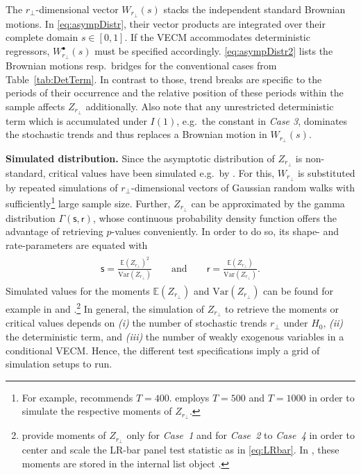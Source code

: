 The $ r_\perp $-dimensional vector $ W_{r_\perp} {\left( s \right)} $ stacks the independent standard Brownian motions. In \eqref{eq:asympDistr}, their vector products are integrated over their complete domain $ s \in [0,1] $. If the VECM accommodates deterministic regressors, $ W^\bullet_{r_\perp} {\left( s \right)} $ must be specified accordingly. \eqref{eq:asympDistr2} lists the Brownian motions resp.~bridges for the conventional cases from Table~\ref{tab:DetTerm}. In contrast to those, trend breaks are specific to the periods of their occurrence and the relative position of these periods within the sample affects $ Z_{r_\perp} $ additionally. Also note that any unrestricted deterministic term which is accumulated under $ I(1) $, e.g.~the constant in \textit{Case 3}, dominates the stochastic trends and thus replaces a Brownian motion in $ W_{r_\perp} {\left( s \right)} $.

\textbf{Simulated distribution.} Since the asymptotic distribution of $ Z_{r_\perp} $ is non-standard, critical values have been simulated e.g.~by \citet{OsterwaldLenum1992}. For this, $ W_{r_\perp} $ is substituted by repeated simulations of $ r_\perp $-dimensional vectors of Gaussian random walks with sufficiently\footnote{For example, \citet[Ch.~15]{Johansen1996} recommends $T=400$. \citet[p.~171, App.~B]{Breitung2005} employs $ T=500$ and \citet{OersalDroge2014} $ T=1000 $ in order to simulate the respective moments of $ Z_{r_\perp} $.} large sample size. Further, $ Z_{r_\perp} $ can be approximated by the gamma distribution $ \Gamma (\mathsf{s}, \mathsf{r}) $, whose continuous probability density function offers the advantage of retrieving $p$-values conveniently. In order to do so, its shape- and rate-parameters are equated with
\begin{align} \label{eq:GammaParameter}
\begin{split}
	\mathsf{s} = \frac{\mathbb{E}(Z_{r_\perp})^2}{ \text{Var}(Z_{r_\perp}) } \qquad \text{and} \qquad \mathsf{r} = \frac{\mathbb{E}(Z_{r_\perp})}{ \text{Var}(Z_{r_\perp}) }.
\end{split}
\end{align}
Simulated values for the moments $ \mathbb{E}(Z_{r_\perp}) $ and $ \text{Var}(Z_{r_\perp}) $ can be found for example in \citet{LarssonEtAl2001} and \citet{Breitung2005}.\footnote{\citet{LarssonEtAl2001} provide moments of $ Z_{r_\perp} $ only for \textit{Case~1} and \citet{Breitung2005} for \textit{Case~2} to \textit{Case~4} in order to center and scale the LR-bar panel test statistic as in \eqref{eq:LRbar}. In , these moments are stored in the internal list object .} In general, the simulation of  $ Z_{r_\perp} $ to retrieve the moments or critical values depends on \textit{(i)} the number of stochastic trends $ r_\perp $ under $ H_0 $, \textit{(ii)} the deterministic term, and \textit{(iii)} the number of weakly exogenous variables in a conditional VECM. Hence, the different test specifications imply a grid of simulation setups to run.

